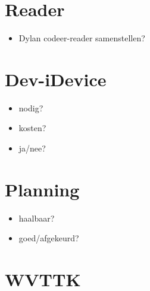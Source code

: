 \documentclass[a4paper, 10pt]{article}
\begin{document}
\section{Reader}
\begin{itemize}
	\item Dylan codeer-reader samenstellen?
\end{itemize}

\section{Dev-iDevice}
\begin{itemize}
	\item nodig?
	\item kosten?
	\item ja/nee?
\end{itemize}

\section{Planning}
\begin{itemize}
	\item haalbaar?
	\item goed/afgekeurd?
\end{itemize}

\newpage
\section{WVTTK}
\end{document}

